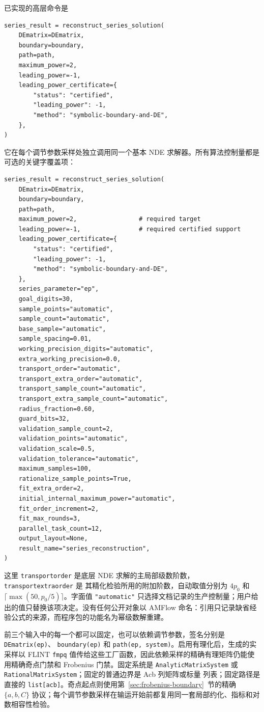\documentclass[11pt,a4paper]{ctexart}
\renewcommand{\_}{\origunderscore\allowbreak}
\begin{document}
已实现的高层命令是
\begin{verbatim}
series_result = reconstruct_series_solution(
    DEmatrix=DEmatrix,
    boundary=boundary,
    path=path,
    maximum_power=2,
    leading_power=-1,
    leading_power_certificate={
        "status": "certified",
        "leading_power": -1,
        "method": "symbolic-boundary-and-DE",
    },
)
\end{verbatim}
它在每个调节参数采样处独立调用同一个基本 NDE 求解器。所有算法控制量都是可选的关键字覆盖项：
\begin{verbatim}
series_result = reconstruct_series_solution(
    DEmatrix=DEmatrix,
    boundary=boundary,
    path=path,
    maximum_power=2,                 # required target
    leading_power=-1,                # required certified support
    leading_power_certificate={
        "status": "certified",
        "leading_power": -1,
        "method": "symbolic-boundary-and-DE",
    },
    series_parameter="ep",
    goal_digits=30,
    sample_points="automatic",
    sample_count="automatic",
    base_sample="automatic",
    sample_spacing=0.01,
    working_precision_digits="automatic",
    extra_working_precision=0.0,
    transport_order="automatic",
    transport_extra_order="automatic",
    transport_sample_count="automatic",
    transport_extra_sample_count="automatic",
    radius_fraction=0.60,
    guard_bits=32,
    validation_sample_count=2,
    validation_points="automatic",
    validation_scale=0.5,
    validation_tolerance="automatic",
    maximum_samples=100,
    rationalize_sample_points=True,
    fit_extra_order=2,
    initial_internal_maximum_power="automatic",
    fit_order_increment=2,
    fit_max_rounds=3,
    parallel_task_count=12,
    output_layout=None,
    result_name="series_reconstruction",
)
\end{verbatim}
这里 \texttt{transport\_order} 是底层 NDE 求解的主局部级数阶数，\texttt{transport\_extra\_order} 是
其精化检验所用的附加阶数，自动取值分别为 $4p_0$ 和 $\lceil\max(50,p_0/5)\rceil$。字面值
\texttt{"automatic"} 只选择文档记录的生产控制量；用户给出的值只替换该项决定。没有任何公开对象以 AMFlow
命名：引用只记录缺省经验公式的来源，而程序包的功能名为幂级数解重建。

前三个输入中的每一个都可以固定，也可以依赖调节参数，签名分别是 \texttt{DEmatrix(ep)}、
\texttt{boundary(ep)} 和 \texttt{path(ep, system)}。启用有理化后，生成的实采样以 FLINT \texttt{fmpq}
值传给这些工厂函数，因此依赖采样的精确有理矩阵仍能使用精确奇点门禁和 Frobenius 门禁。固定系统是
\texttt{AnalyticMatrixSystem} 或 \texttt{RationalMatrixSystem}；固定的普通边界是 Acb 列矩阵或标量
列表；固定路径是直接的 \texttt{list[acb]}。奇点起点则使用第~\ref{sec:frobenius-boundary}~节的精确
$\{a,b,C\}$ 协议；每个调节参数采样在输运开始前都复用同一套局部约化、指标和对数相容性检验。
\end{document}
